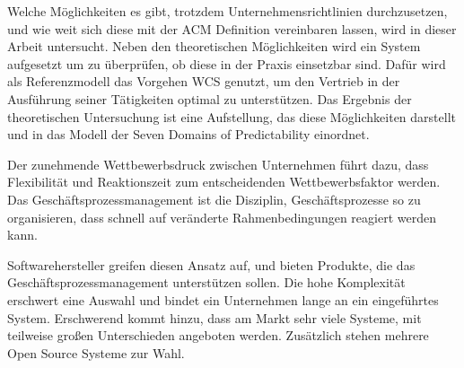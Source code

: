 Welche Möglichkeiten es gibt, trotzdem Unternehmensrichtlinien durchzusetzen, und wie weit sich diese mit der \ac{ACM} Definition vereinbaren lassen, wird in dieser Arbeit untersucht.
Neben den theoretischen Möglichkeiten wird ein System aufgesetzt um zu überprüfen, ob diese in der Praxis einsetzbar sind. Dafür wird als Referenzmodell das Vorgehen \ac{WCS} genutzt, um den Vertrieb in der Ausführung seiner Tätigkeiten optimal zu unterstützen.
Das Ergebnis der theoretischen Untersuchung ist eine Aufstellung, das diese Möglichkeiten darstellt und in das Modell der \glqq Seven Domains of Predictability\grqq{} einordnet.

Der zunehmende Wettbewerbsdruck zwischen Unternehmen führt dazu, dass Flexibilität und Reaktionszeit zum entscheidenden Wettbewerbsfaktor werden. Das Geschäftsprozessmanagement ist die Disziplin, Geschäftsprozesse so zu organisieren, dass schnell auf veränderte Rahmenbedingungen reagiert werden kann.

\smallskip\noindent Softwarehersteller greifen diesen Ansatz auf, und bieten Produkte, die das Geschäftsprozessmanagement unterstützen sollen. Die hohe Komplexität erschwert eine Auswahl und bindet ein Unternehmen lange an ein eingeführtes System. Erschwerend kommt hinzu, dass am Markt sehr viele Systeme, mit teilweise großen Unterschieden angeboten werden. Zusätzlich stehen mehrere Open Source Systeme zur Wahl.

\vfill
